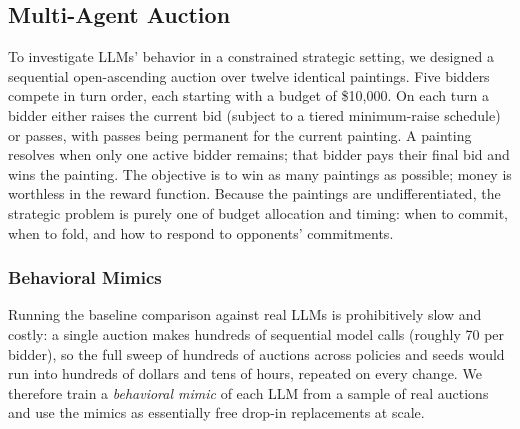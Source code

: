 \documentclass[conference]{IEEEtran}
\begin{document}
\subsection{Multi-Agent Auction}
To investigate LLMs' behavior in a constrained strategic setting, we designed a sequential open-ascending auction over twelve identical paintings. Five bidders compete in turn order, each starting with a budget of \$10,000. On each turn a bidder either raises the current bid (subject to a tiered minimum-raise schedule) or passes, with passes being permanent for the current painting. A painting resolves when only one active bidder remains; that bidder pays their final bid and wins the painting. The objective is to win as many paintings as possible; money is worthless in the reward function. Because the paintings are undifferentiated, the strategic problem is purely one of budget allocation and timing: when to commit, when to fold, and how to respond to opponents' commitments.

\subsubsection{Behavioral Mimics}
\label{sec:mimics}
Running the baseline comparison against real LLMs is prohibitively slow and costly: a single auction makes hundreds of sequential model calls (roughly 70 per bidder), so the full sweep of hundreds of auctions across policies and seeds would run into hundreds of dollars and tens of hours, repeated on every change. We therefore train a \emph{behavioral mimic} of each LLM from a sample of real auctions and use the mimics as essentially free drop-in replacements at scale.
\end{document}
